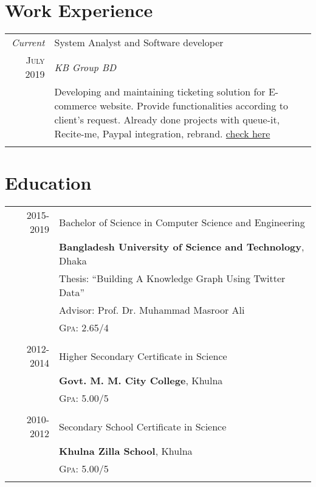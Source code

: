 \documentclass[a4paper,10pt]{article}
\begin{document}
\section{Work Experience}
\begin{tabular}{r|p{11cm}}
 \emph{Current} & System Analyst and Software developer \textsc{}  \\\textsc{July 2019}&\emph{KB Group BD}\\&\footnotesize{Developing and maintaining ticketing solution for E-commerce website. Provide functionalities according to client's request. Already done projects with queue-it, Recite-me, Paypal integration, rebrand. \href{https://tickets.delfontmackintosh.co.uk/continueshopping.asp}{check here}
 }\\\multicolumn{2}{c}{} \\

\end{tabular}

\section{Education}
\begin{tabular}{rl}	


\textsc{} 2015-2019 & Bachelor of Science in Computer Science and Engineering\\ 
& \textbf{Bangladesh University of Science and Technology}, Dhaka\\
& Thesis: ``Building A Knowledge Graph Using Twitter Data'' \\& \small Advisor: Prof. Dr. Muhammad Masroor Ali \\
&\normalsize \textsc{Gpa}: 2.65/4\\&\\

\textsc{} 2012-2014 & Higher Secondary Certificate in  Science \\
& \textbf{Govt. M. M. City College}, Khulna\\
&\normalsize \textsc{Gpa}: 5.00/5\\&\\

\textsc{} 2010-2012 & Secondary School Certificate in  Science \\
& \textbf{Khulna Zilla School}, Khulna\\
&\normalsize \textsc{Gpa}: 5.00/5\\&\\

\end{tabular}
\end{document}
